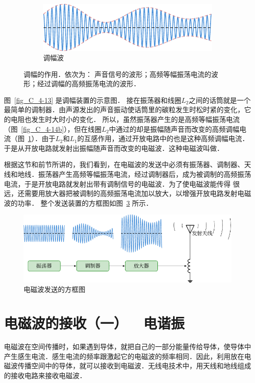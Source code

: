 \begin{figure}[htbp]
\begin{minipage}[b]{0.7\linewidth}
    	\\
    	\begin{subfigure}{0.9\linewidth}
    		\centering
    		\includegraphics{fig/C/4-14c.pdf}
    		\caption{调幅波}\label{fig_C_4-14c}
    	\end{subfigure}
    	\caption{调幅的作用．依次为：
    		声音信号的波形；高频等幅振荡电流的波形；经过调幅的高频振荡电流的波形．}\label{fig_C_4-14}
    \end{minipage}
\end{figure}



图~\ref{fig_C_4-13} 是调幅装置的示意图．
接在振荡器和线圈$L_2$之间的话筒就是一个最简单的调制器．由声源发出的声音振动使话筒里的碳粒发生时松时紧的变化，它的电阻也发生时大时小的变化．
所以，虽然振荡器产生的是高频等幅振荡电流
（图~\ref{fig_C_4-14b}），但在线圈$L_2$中通过的却是振幅随声音而改变的高频调幅电流（图~\ref{fig_C_4-14c}）．由于$L_2$和$L_1$的互感作用，通过开放电路中的也是这种高频调幅电流．
于是从开放电路就发射出振幅随声音而改变的电磁波．这种电磁波叫做．

根据这节和前节所讲的，我们看到，在电磁波的发送中必须有振荡器、调制器、天线和地线．振荡器产生高频等幅振荡电流，经过调制器后，成为被调制的高频振荡电流，于是开放电路就发射出带有调制信号的电磁波．为了使电磁波能传得
很远，还需要用放大器把被调制的高频振荡电流加以放大，以增强开放电路发射电磁波的功率．
整个发送装置的方框图如图~\ref{fig_C_4-15} 所示．
\begin{figure}[htbp]
    \centering
    \includegraphics{fig/C/4-15.pdf}
    \caption{电磁波发送的方框图}\label{fig_C_4-15}
\end{figure}

\section{电磁波的接收（一）~~电谐振}
电磁波在空间传播时，如果遇到导体，就把自己的一部分能量传给导体，使导体中产生感生电流．感生电流的频率跟激起它的电磁波的频率相同．因此，利用放在电磁波传播空间中的导体，就可以接收到电磁波．无线电技术中，用天线和地线组成的接收电路来接收电磁波．

